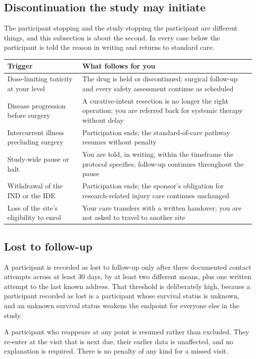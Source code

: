 \subsection{Discontinuation the study may initiate}

The participant stopping and the study stopping the participant are different
things, and this subsection is about the second. In every case below the
participant is told the reason in writing and returns to standard care.

\vspace{0.30em}

\noindent\begin{tabularx}{\textwidth}{L{5.0cm} Y}
\toprule
\textbf{Trigger} & \textbf{What follows for you} \\
\midrule
Dose-limiting toxicity at your level & The drug is held or discontinued; surgical follow-up and every safety assessment continue as scheduled \\
Disease progression before surgery & A curative-intent resection is no longer the right operation; you are referred back for systemic therapy without delay \\
Intercurrent illness precluding surgery & Participation ends; the standard-of-care pathway resumes without penalty \\
Study-wide pause or halt & You are told, in writing, within the timeframe the protocol specifies; follow-up continues throughout the pause \\
Withdrawal of the IND or the IDE & Participation ends; the sponsor's obligation for research-related injury care continues unchanged \\
Loss of the site's eligibility to enrol & Your care transfers with a written handover; you are not asked to travel to another site \\
\bottomrule
\end{tabularx}

\vspace{0.30em}

\subsection{Lost to follow-up}

A participant is recorded as lost to follow-up only after three documented
contact attempts across at least 30 days, by at least two different means, plus
one written attempt to the last known address. That threshold is deliberately
high, because a participant recorded as lost is a participant whose survival
status is unknown, and an unknown survival status weakens the endpoint for
everyone else in the study.

A participant who reappears at any point is resumed rather than excluded. They
re-enter at the visit that is next due, their earlier data is unaffected, and no
explanation is required. There is no penalty of any kind for a missed visit.
